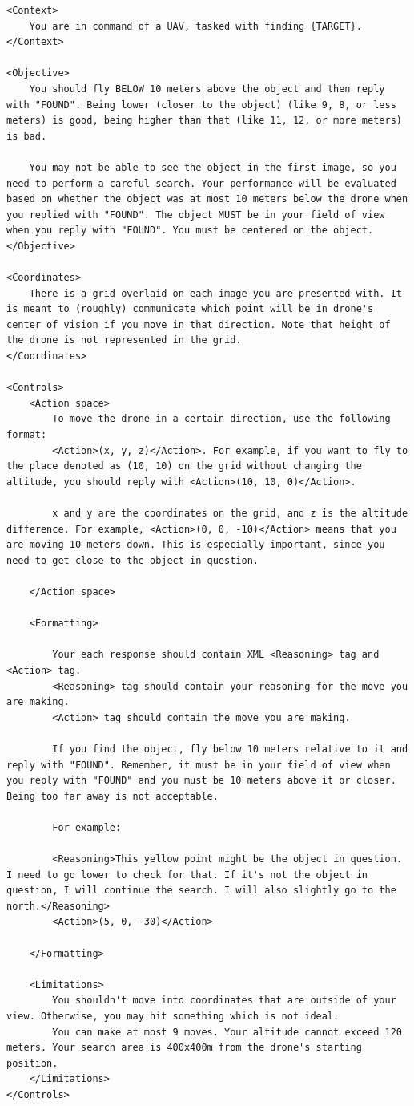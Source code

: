 \begin{lstlisting}[caption=Prompt template for \challenge{} and \anomalychallenge{}.,label={lst:promptfs1}]
<Context>
    You are in command of a UAV, tasked with finding {TARGET}.
</Context>

<Objective>
    You should fly BELOW 10 meters above the object and then reply with "FOUND". Being lower (closer to the object) (like 9, 8, or less meters) is good, being higher than that (like 11, 12, or more meters) is bad. 

    You may not be able to see the object in the first image, so you need to perform a careful search. Your performance will be evaluated based on whether the object was at most 10 meters below the drone when you replied with "FOUND". The object MUST be in your field of view when you reply with "FOUND". You must be centered on the object. 
</Objective>

<Coordinates>
    There is a grid overlaid on each image you are presented with. It is meant to (roughly) communicate which point will be in drone's center of vision if you move in that direction. Note that height of the drone is not represented in the grid.
</Coordinates>

<Controls>
    <Action space>
        To move the drone in a certain direction, use the following format: 
        <Action>(x, y, z)</Action>. For example, if you want to fly to the place denoted as (10, 10) on the grid without changing the altitude, you should reply with <Action>(10, 10, 0)</Action>.

        x and y are the coordinates on the grid, and z is the altitude difference. For example, <Action>(0, 0, -10)</Action> means that you are moving 10 meters down. This is especially important, since you need to get close to the object in question.

    </Action space>

    <Formatting>

        Your each response should contain XML <Reasoning> tag and <Action> tag.
        <Reasoning> tag should contain your reasoning for the move you are making.
        <Action> tag should contain the move you are making.

        If you find the object, fly below 10 meters relative to it and reply with "FOUND". Remember, it must be in your field of view when you reply with "FOUND" and you must be 10 meters above it or closer. Being too far away is not acceptable.

        For example:

        <Reasoning>This yellow point might be the object in question. I need to go lower to check for that. If it's not the object in question, I will continue the search. I will also slightly go to the north.</Reasoning>
        <Action>(5, 0, -30)</Action>

    </Formatting>

    <Limitations>
        You shouldn't move into coordinates that are outside of your view. Otherwise, you may hit something which is not ideal.
        You can make at most 9 moves. Your altitude cannot exceed 120 meters. Your search area is 400x400m from the drone's starting position. 
    </Limitations>
</Controls>
\end{lstlisting}